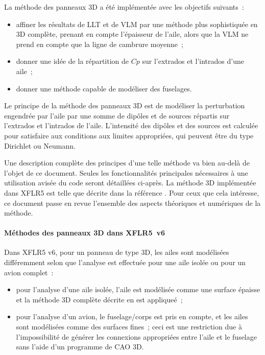 \documentclass[a4paper,twoside,12pt,dvips]{article}
\begin{document}
La méthode des panneaux 3D a été implémentée avec les objectifs suivants~:

\begin{itemize}
	\item affiner les résultats de LLT et de VLM par une méthode plus 
	sophistiquée en 3D complète, prenant en compte l’épaisseur de l’aile, alors 
	que la VLM ne prend en compte que la ligne de cambrure moyenne~;
	\item donner une idée de la répartition de $Cp$ sur l’extrados et 
	l’intrados d’une aile~;
	\item donner une méthode capable de modéliser des fuselages.
\end{itemize}

Le principe de la méthode des panneaux 3D est de modéliser la perturbation engendrée par l’aile par une somme de dipôles et de sources répartis sur l’extrados et l’intrados de l’aile. L’intensité des dipôles et des sources est calculée pour satisfaire aux conditions aux limites appropriées, qui peuvent être du type Dirichlet ou Neumann. 

Une description complète des principes d’une telle méthode va bien au-delà de l’objet de ce document. Seules les fonctionnalités principales nécessaires à une utilisation avisée du code seront détaillées ci-après. La méthode 3D implémentée dans XFLR5 est telle que décrite dans la référence \cite{Maskew}. Pour ceux que cela intéresse, ce document passe en revue l’ensemble des aspects théoriques et numériques de la méthode. 

\paragraph{Méthodes des panneaux 3D dans XFLR5~v6}

Dans XFLR5 v6, pour un panneau de type 3D, les ailes sont modélisées
différemment selon que l’analyse est effectuée pour une aile isolée ou
pour un avion complet~:

\begin{itemize}
	\item pour l’analyse d’une aile isolée, l’aile est modélisée comme une 
	surface épaisse et la méthode 3D complète décrite en \cite{Maskew} est 
	appliqueé~;
	\item pour l’analyse d’un avion, le fuselage/corps est pris en compte, et 
	les ailes sont modélisées comme des surfaces fines~; ceci est une 
	restriction due à l’impossibilité de générer les connexions appropriées 
	entre l’aile et le fuselage sans l’aide d’un programme de CAO 3D.
\end{itemize}
\end{document}

